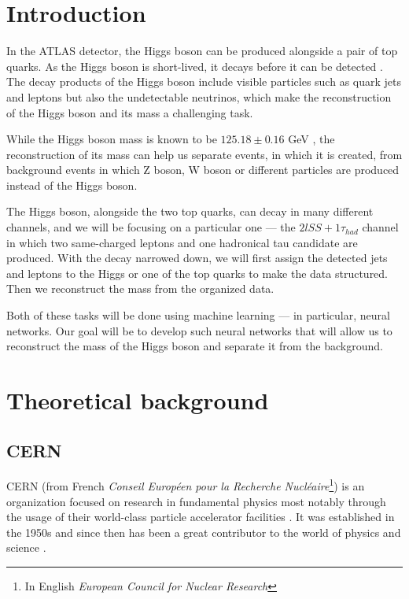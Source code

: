 \documentclass{ctuthesis}
\begin{document}
\maketitle

\chapter*{Introduction}
In the ATLAS detector, the Higgs boson can be produced alongside a pair of top quarks. As the Higgs boson is short-lived, it decays before it can be detected \cite{higgs_3}. The decay products of the Higgs boson include visible particles such as quark jets and leptons but also the undetectable neutrinos, which make the reconstruction of the Higgs boson and its mass a challenging task.

While the Higgs boson mass is known to be $125.18 \pm 0.16$ GeV \cite{W_Z_decay}, the reconstruction of its mass can help us separate events, in which it is created, from background events in which Z boson, W boson or different particles are produced instead of the Higgs boson.

The Higgs boson, alongside the two top quarks, can decay in many different channels, and we will be focusing on a particular one — the $2lSS + 1 \tau _{had}$ channel in which two same-charged leptons and one hadronical tau candidate are produced. With the decay narrowed down, we will first assign the detected jets and leptons to the Higgs or one of the top quarks to make the data structured. Then we reconstruct the mass from the organized data.

Both of these tasks will be done using machine learning — in particular, neural networks. Our goal will be to develop such neural networks that will allow us to reconstruct the mass of the Higgs boson and separate it from the background.

\chapter{Theoretical background}

\section{CERN}
CERN (from French \emph{Conseil Européen pour la Recherche Nucléaire}\footnote{In English \emph{European Council for Nuclear Research}}) is an organization focused on research in fundamental physics most notably through the usage of their world-class particle accelerator facilities \cite{cern1}. It was established in the 1950s and since then has been a great contributor to the world of physics and science \cite{cern2}.
\end{document}
